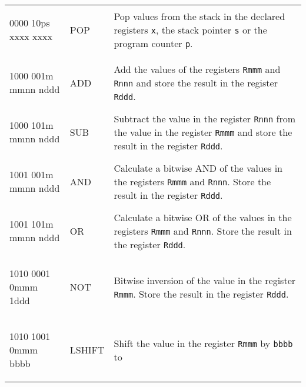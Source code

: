 \documentclass{report}
\newcommand{\boxchar}[1]{\begin{boxednumbers} #1
\end{boxednumbers}}
\begin{document}
\begin{center}
\begin{longtable}{m{}m{}m{}}
        \boxchar{0000 10ps xxxx xxxx} & POP       & Pop values from the stack in the declared registers \texttt{x}, the stack pointer \texttt{s} or the program counter \texttt{p}.\\
        &&\\
        \boxchar{1000 001m mmnn nddd} & ADD       & Add the values of the registers
                                                    \texttt{Rmmm} and \texttt{Rnnn} and
                                                    store the result in the register
                                                    \texttt{Rddd}.\\
                                                    \hline
        \boxchar{1000 101m mmnn nddd} & SUB       & Subtract the value in the register
                                                    \texttt{Rnnn} from the value in
                                                    the register \texttt{Rmmm} and store
                                                    the result in the register
                                                    \texttt{Rddd}.\\
                                                    \hline
        \boxchar{1001 001m mmnn nddd} & AND       & Calculate a bitwise AND of the values in
                                                    the registers \texttt{Rmmm}
                                                    and \texttt{Rnnn}. Store the result
                                                    in the register \texttt{Rddd}.\\
                                                    \hline
        \boxchar{1001 101m mmnn nddd} & OR        & Calculate a bitwise OR of the values
                                                    in the registers \texttt{Rmmm} and
                                                    \texttt{Rnnn}. Store the result in
                                                    the register \texttt{Rddd}.\\
                                                    \hline
        \boxchar{1010 0001 0mmm 1ddd} & NOT       & Bitwise inversion of the value in
                                                    the register \texttt{Rmmm}. Store
                                                    the result in the register
                                                    \texttt{Rddd}.\\
                                                    \hline
        \boxchar{1010 1001 0mmm bbbb} & LSHIFT    & Shift the value in the register
                                                    \texttt{Rmmm} by \texttt{bbbb} to

\end{longtable}
\end{center}
\end{document}
